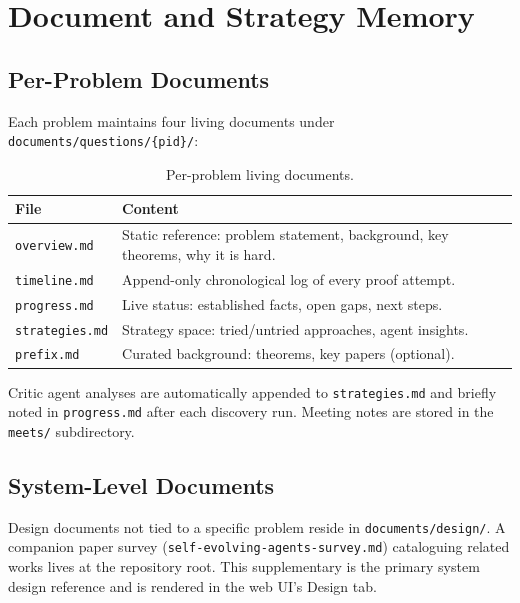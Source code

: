 \documentclass[11pt]{article}
\begin{document}
\section{Document and Strategy Memory}
\label{app:docs}

\subsection{Per-Problem Documents}

Each problem maintains four living documents under
\texttt{documents/questions/\{pid\}/}:

\begin{table}[h]
\centering
\small
\begin{tabularx}{\linewidth}{@{}lX@{}}
\toprule
\textbf{File} & \textbf{Content} \\
\midrule
\texttt{overview.md}  & Static reference: problem statement, background,
                         key theorems, why it is hard. \\
\texttt{timeline.md}  & Append-only chronological log of every proof attempt. \\
\texttt{progress.md}  & Live status: established facts, open gaps, next steps. \\
\texttt{strategies.md}& Strategy space: tried/untried approaches, agent insights. \\
\texttt{prefix.md}    & Curated background: theorems, key papers (optional). \\
\bottomrule
\end{tabularx}
\caption{Per-problem living documents.}
\end{table}

Critic agent analyses are automatically appended to \texttt{strategies.md}
and briefly noted in \texttt{progress.md} after each discovery run.
Meeting notes are stored in the \texttt{meets/} subdirectory.

\subsection{System-Level Documents}

Design documents not tied to a specific problem reside in
\texttt{documents/design/}.
A companion paper survey (\texttt{self-evolving-agents-survey.md})
cataloguing related works lives at the repository root.
This supplementary is the primary system design reference
and is rendered in the web UI's Design tab.
\end{document}
